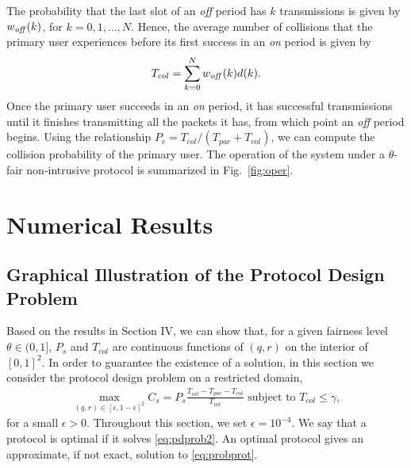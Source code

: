 \documentclass[12pt,draftclsnofoot,onecolumn]{IEEEtran}
\begin{document}
The probability that the last slot of an \emph{off} period
has $k$ transmissions is given by ${w}_{\textrm{\emph{off}}}(k)$, for $k = 0,1,\ldots,N$.
Hence, the average number of collisions that the primary user experiences
before its first success in an \emph{on} period is given by
\begin{align*}
T_{col} = \sum_{k=0}^{N} {w}_{\textrm{\emph{off}}}(k) d(k).
\end{align*}
Once the primary user succeeds in an \emph{on} period, it
has successful transmissions until it finishes transmitting
all the packets it has, from which point an \emph{off} period begins.
Using the relationship $P_c = T_{col}/(T_{pac}+T_{col})$, we can
compute the collision probability of the primary user.
The operation of the system under a $\theta$-fair non-intrusive protocol is summarized in Fig.~\ref{fig:oper}.

\section{Numerical Results}

\subsection{Graphical Illustration of the Protocol Design Problem} \label{sec:graph}

Based on the results in Section IV, we can show that, for a given fairness level $\theta \in (0,1]$,
$P_s$ and $T_{col}$ are continuous functions of $(q,r)$ on the
interior of $[0,1]^2$. In order to guarantee the existence of a solution,
in this section we consider the protocol design problem on a restricted domain,
\begin{align} \label{eq:pdprob2}
\max_{(q,r) \in [\epsilon,1-\epsilon]^2} C_s = P_s \frac{T_{int} - T_{pac} - T_{col}}{T_{int}} \textrm{ subject to } T_{col} \leq \gamma,
\end{align}
for a small $\epsilon > 0$. Throughout this section, we set $\epsilon = 10^{-4}$.
We say that a protocol is optimal if it solves \eqref{eq:pdprob2}.
An optimal protocol gives an approximate, if not exact, solution to \eqref{eq:probprot}.
\end{document}
